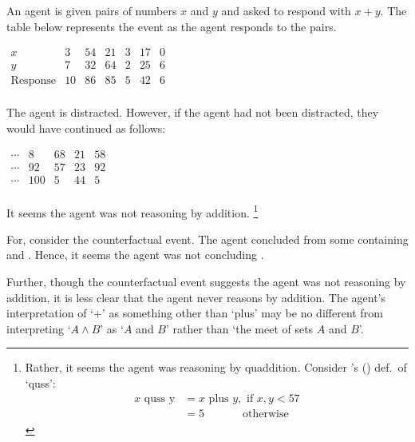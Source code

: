 \begin{note}
  \begin{scenario}[Addition]%
    \label{illu:quus}%
    An agent is given pairs of numbers \(x\) and \(y\) and asked to respond with \(x + y\).
    The table below represents the event as the agent responds to the pairs.

    \medskip
    \hspace{2.8em}%
    \(
      \begin{array}{ccccccc}
      x & 3 & 54 & 21 & 3 & 17 & 0 \\
      y & 7 & 32 & 64 & 2 & 25 & 6 \\
      \hline
      \text{Response} & 10 & 86 & 85 & 5 & 42 & 6 \\
    \end{array}
    \)
    \medskip

    \noindent%
    The agent is distracted.
    However, if the agent had not been distracted, they would have continued as follows:

    \medskip
    \hfill%
    \(
    \begin{array}{ccccc}
      \cdots & 8 & 68 & 21 & 58 \\
      \cdots & 92 & 57 & 23 & 92 \\
      \hline
      \cdots & 100 & 5 & 44 & 5 \\
    \end{array}
    \)%
    \hspace{2.8em}%
    \mbox{ }%
    \newline%
  \end{scenario}

  \noindent%
  It seems the agent was not reasoning by addition.%
  \footnote{
    Rather, it seems the agent was reasoning by quaddition.
    Consider \citeauthor{Kripke:1982aa}'s (\citeyear{Kripke:1982aa}) def.\ of `quss':
    \begin{align*}
      x \text{ quss y} &= x \text{ plus } y, \text{ if } x,y < 57 \\
                       &= 5 \phantom{pl if x,,} \text{ otherwise }
    \end{align*}
    \vspace{-\baselineskip}
  }

  For, consider the counterfactual event.
  The agent concluded  from some \pool{} containing  and .
  Hence, it seems the agent was not concluding .

  Further, though the counterfactual event suggests the agent was not reasoning by addition, it is less clear that the agent never reasons by addition.
  The agent's interpretation of `\(+\)' as something other than `plus' may be no different from interpreting `\(A \land B\)' as `\(A\) and \(B\)' rather than `the meet of sets \(A\) and \(B\)'.
\end{note}



